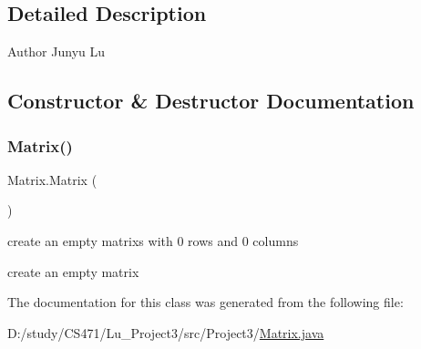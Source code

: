\subsection{Detailed Description}
\begin{DoxyAuthor}{Author}
Junyu Lu 
\end{DoxyAuthor}


\subsection{Constructor \& Destructor Documentation}
\mbox{\label{class_matrix_afab2892bc6e20ba00745e13efc047f54}} 
\subsubsection{\texorpdfstring{Matrix()}{Matrix()}}
{\footnotesize\ttfamily Matrix.\+Matrix (\begin{DoxyParamCaption}{ }\end{DoxyParamCaption})}



create an empty matrixs with 0 rows and 0 columns 

create an empty matrix 

The documentation for this class was generated from the following file\+:\begin{DoxyCompactItemize}
\item 
D\+:/study/\+C\+S471/\+Lu\+\_\+\+Project3/src/\+Project3/\mbox{\hyperlink{_matrix_8java}{Matrix.\+java}}\end{DoxyCompactItemize}
